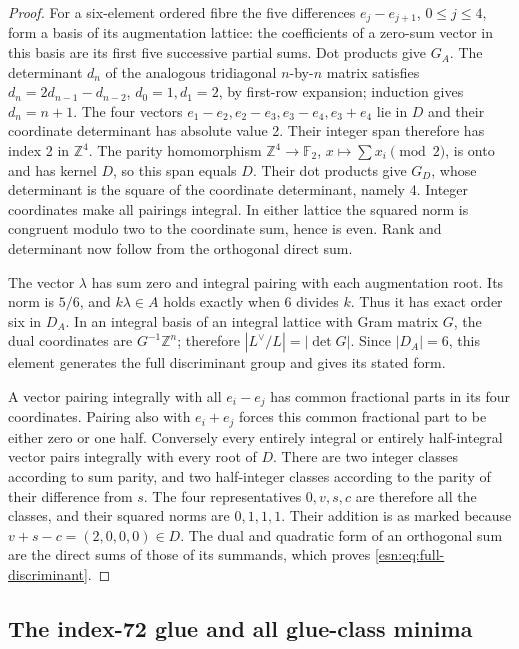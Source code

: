 \begin{proof}
For a six-element ordered fibre the five differences
\(e_j-e_{j+1}\), \(0\le j\le4\), form a basis of its augmentation
lattice: the coefficients of a zero-sum vector in this basis are its
first five successive partial sums.  Dot products give \(G_A\).
The determinant \(d_n\) of the analogous tridiagonal \(n\)-by-\(n\)
matrix satisfies \(d_n=2d_{n-1}-d_{n-2}\), \(d_0=1,d_1=2\), by
first-row expansion; induction gives \(d_n=n+1\).
The four vectors
\(e_1-e_2,e_2-e_3,e_3-e_4,e_3+e_4\) lie in \(D\) and their
coordinate determinant has absolute value 2.  Their integer span
therefore has index 2 in \(\mathbb Z^4\).  The parity homomorphism
\(\mathbb Z^4\to\mathbb F_2\), \(x\mapsto\sum x_i\pmod2\), is
onto and has kernel \(D\), so this span equals \(D\).
Their dot products give \(G_D\), whose determinant is the square of
the coordinate determinant, namely 4.  Integer coordinates make all
pairings integral.  In either lattice the squared norm is congruent
modulo two to the coordinate sum, hence is even.  Rank and determinant
now follow from the orthogonal direct sum.

The vector \(\lambda\) has sum zero and integral pairing with each
augmentation root.  Its norm is \(5/6\), and \(k\lambda\in A\)
holds exactly when \(6\) divides \(k\).  Thus it has exact order six
in \(D_A\).  In an integral basis of an integral lattice with Gram
matrix \(G\), the dual coordinates are \(G^{-1}\mathbb Z^n\);
therefore \(|L^\vee/L|=|\det G|\).  Since \(|D_A|=6\), this
element generates the full discriminant group and gives its stated form.

A vector pairing integrally with all \(e_i-e_j\) has common
fractional parts in its four coordinates.  Pairing also with
\(e_i+e_j\) forces this common fractional part to be either zero or
one half.  Conversely every entirely integral or entirely half-integral
vector pairs integrally with every root of \(D\).  There are two
integer classes according to sum parity, and two half-integer classes
according to the parity of their difference from \(s\).  The four
representatives \(0,v,s,c\) are therefore all the classes, and their
squared norms are \(0,1,1,1\).  Their addition is as marked because
\(v+s-c=(2,0,0,0)\in D\).  The dual and quadratic form of an
orthogonal sum are the direct sums of those of its summands, which proves
\eqref{esn:eq:full-discriminant}.
\end{proof}

\subsection{The index-72 glue and all glue-class minima}
\label{esn:subsec:glue}

